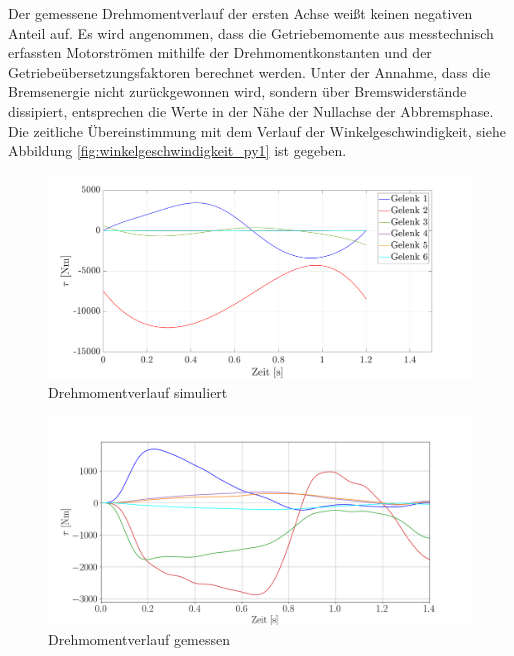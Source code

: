 %
%
Der gemessene Drehmomentverlauf der ersten Achse weißt keinen negativen Anteil auf. Es wird angenommen, dass die Getriebemomente aus messtechnisch erfassten Motorströmen mithilfe der Drehmomentkonstanten und der Getriebeübersetzungsfaktoren berechnet werden. Unter der Annahme, dass die Bremsenergie nicht zurückgewonnen wird, sondern über Bremswiderstände dissipiert, entsprechen die Werte in der Nähe der Nullachse der Abbremsphase. Die zeitliche Übereinstimmung mit dem Verlauf der Winkelgeschwindigkeit, siehe Abbildung \ref{fig:winkelgeschwindigkeit_py1} ist gegeben.  


\begin{figure}[tbph]
	\centering
	\includegraphics[width=1\linewidth]{images/taumat}
	\caption{Drehmomentverlauf simuliert}
	\label{fig:taumat}
\end{figure}
%
\begin{figure}[tbph]
	\centering
	\includegraphics[width=1\linewidth]{images/tau}
	\caption{Drehmomentverlauf gemessen}
	\label{fig:tau}
\end{figure}
%
